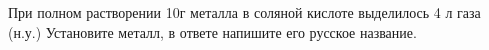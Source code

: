 
При
полном растворении 10г металла в соляной кислоте выделилось 4 л газа (н.у.)
Установите металл, в ответе напишите его русское название.



